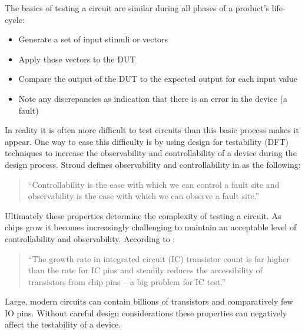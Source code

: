 \documentclass[12pt]{report}
\begin{document}
The basics of testing a circuit are similar during all phases of a product's life-cycle:
\begin{itemize}
\item Generate a set of input stimuli or vectors
\item Apply those vectors to the DUT
\item Compare the output of the DUT to the expected output for each input value
\item Note any discrepancies as indication that there is an error in the device (a fault)
\end{itemize}
In reality it is often more difficult to test circuits than this basic process makes it appear.  One way to ease this difficulty is by using design for testability (DFT) techniques to increase the observability and controllability of a device during the design process\cite{stroud}.  Stroud defines observability and controllability in \cite{stroud} as the following:
\begin{quote}
``Controllability is the ease with which we can control a fault site and observability is the ease with which we can observe a fault site.\cite{stroud}''
\end{quote}
Ultimately these properties determine the complexity of testing a circuit.  As chips grow it becomes increasingly challenging to maintain an acceptable level of controllability and observability.  According to \cite{zorian}: 
\begin{quote}
``The growth rate in integrated circuit (IC) transistor count is far higher than the rate for IC pins and steadily reduces the accessibility of transistors from chip pins -- a big problem for IC test.\cite{zorian}''
\end{quote}
Large, modern circuits can contain billions of transistors and comparatively few IO pins\cite{zorian}.  Without careful design considerations these properties can negatively affect the testability of a device\cite{stroud}.
\end{document}
